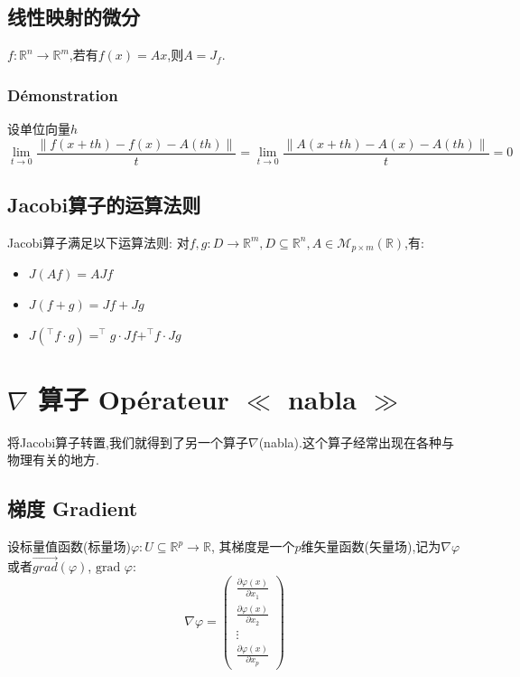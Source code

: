 \documentclass[12pt, a4paper, oneside]{ctexbook}
\newcommand{\R }{\mathbb{R}}%
\begin{document}
    \subsection{线性映射的微分}
    $f:\R^n\rightarrow \R^m$,若有$f(x)=Ax$,则$A=J_f$.
    \subsubsection{Démonstration}
    设单位向量$h$
    $$
      \lim_{t \to 0}\frac{\left\lVert f(x+th)-f(x)-A(th) \right\rVert }{t}  =\lim_{t \to 0}\frac{\left\lVert A(x+th)-A(x)-A(th) \right\rVert }{t} =0 
    $$
    \subsection{Jacobi算子的运算法则}
    Jacobi算子满足以下运算法则:
    对$f,g:D\rightarrow \R^m, D\subseteq\R^n,A\in\mathcal{M}_{p\times m}(\R)$,有:
    \begin{itemize}
      \item $J(Af)=AJf$
      \item $J(f+g)=Jf+Jg$
      \item $J(^\top f\cdot g)=^\top g\cdot Jf+^\top f\cdot Jg$
    \end{itemize}
\section{$\nabla$ 算子 Opérateur $\ll$ nabla $\gg$ }%
    将Jacobi算子转置,我们就得到了另一个算子$\nabla$(nabla).这个算子经常出现在各种与物理有关的地方.

  \subsection{梯度 Gradient}
    设标量值函数(标量场)$\varphi:U\subseteq \R^p \rightarrow \R$,
    其梯度是一个$p$维矢量函数(矢量场),记为$\nabla \varphi$或者$\overrightarrow{grad} (\varphi)$, $\text{grad } \varphi$:
    $$
    \nabla \varphi=
    \begin{pmatrix}
      \frac{\partial \varphi(x)}{\partial x_1}\\
      \frac{\partial \varphi(x)}{\partial x_2}\\
      \vdots \\
      \frac{\partial \varphi(x)}{\partial x_p}
    \end{pmatrix}
    $$
\end{document}
